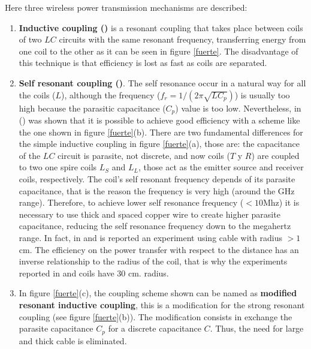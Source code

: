 \documentclass{intech}
\begin{document}
{Here three wireless power transmission mechanisms are described:
\begin{enumerate}
\item {\bf Inductive coupling (\cite{RES3})} is a resonant coupling that takes place between coils of two $LC$ circuits with the same resonant frequency, transferring energy from one coil to the other as it can be seen in figure \ref{fuerte}. The disadvantage of this technique is that efficiency is lost as fast as coils are separated.
\item {\bf Self resonant coupling (\cite{RES1})}. The self resonance occur in a natural way for all the coils ($L$), although the frequency ($f_r=1/(2\pi \sqrt{L C_p})$) is usually too high because the parasitic capacitance ($C_p$) value is too low. Nevertheless, in (\cite{RES1}) was shown that it is possible to achieve good efficiency with a scheme like the one shown in figure \ref{fuerte}(b). There are two fundamental differences for the simple inductive coupling in figure \ref{fuerte}(a), those are: the capacitance of the $LC$ circuit is parasite, not discrete, and now coils ($T$ y $R$) are coupled to two one spire coils $L_S$ and $L_L$, those act as the emitter source and receiver coils, respectively. The coil's self resonant frequency depends of its parasite capacitance, that is the reason the frequency is very high (around the GHz range). Therefore, to achieve lower self resonance frequency ($<10$Mhz) it is necessary to use thick and spaced copper wire to create higher parasite capacitance, reducing the self resonance frequency down to the megahertz range. In fact, in \cite{RES1} and \cite{RES2} is reported an experiment using cable with radius $>1$ cm. The efficiency on the power transfer with respect to the distance has an inverse relationship to the radius of the coil, that is why the experiments reported in \cite{RES1} and \cite{RES2} coils have 30 cm. radius.
\item In figure \ref{fuerte}(c), the coupling scheme shown can be named as {\bf modified resonant inductive coupling}, this is a modification for the strong resonant coupling (see figure \ref{fuerte}(b)). The modification consists in exchange the parasite capacitance $C_p$ for a discrete capacitance $C$. Thus, the need for large and thick cable is eliminated.
\end{enumerate}

}
\end{document}
